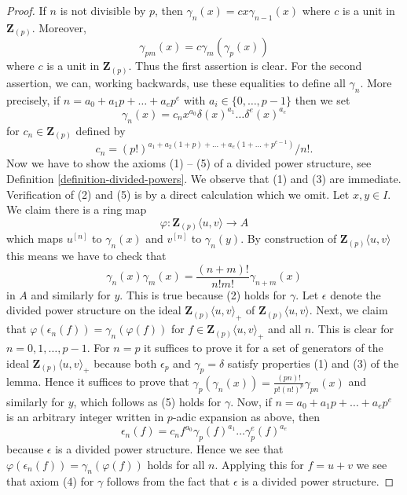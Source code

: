 \begin{proof}
If $n$ is not divisible by $p$, then $\gamma_n(x) = c x \gamma_{n - 1}(x)$
where $c$ is a unit in $\mathbf{Z}_{(p)}$. Moreover,
$$
\gamma_{pm}(x) = c \gamma_m(\gamma_p(x))
$$
where $c$ is a unit in $\mathbf{Z}_{(p)}$. Thus the first assertion is clear.
For the second assertion, we can, working backwards, use these equalities
to define all $\gamma_n$. More precisely, if
$n = a_0 + a_1p + \ldots + a_e p^e$ with $a_i \in \{0, \ldots, p - 1\}$ then
we set
$$
\gamma_n(x) = c_n x^{a_0} \delta(x)^{a_1} \ldots \delta^e(x)^{a_e}
$$
for $c_n \in \mathbf{Z}_{(p)}$ defined by
$$
c_n =
{(p!)^{a_1 + a_2(1 + p) + \ldots + a_e(1 + \ldots + p^{e - 1})}}/{n!}.
$$
Now we have to show the axioms (1) -- (5) of a divided power structure, see
Definition \ref{definition-divided-powers}. We observe that (1) and (3) are
immediate. Verification of (2) and (5) is by a direct calculation which
we omit. Let $x, y \in I$. We claim there is a ring map
$$
\varphi : \mathbf{Z}_{(p)}\langle u, v \rangle \longrightarrow A
$$
which maps $u^{[n]}$ to $\gamma_n(x)$ and $v^{[n]}$ to $\gamma_n(y)$.
By construction of $\mathbf{Z}_{(p)}\langle u, v \rangle$ this means
we have to check that
$$
\gamma_n(x)\gamma_m(x) = \frac{(n + m)!}{n!m!} \gamma_{n + m}(x)
$$
in $A$ and similarly for $y$. This is true because (2) holds for $\gamma$.
Let $\epsilon$ denote the divided power structure on the
ideal $\mathbf{Z}_{(p)}\langle u, v\rangle_{+}$ of
$\mathbf{Z}_{(p)}\langle u, v\rangle$.
Next, we claim that $\varphi(\epsilon_n(f)) = \gamma_n(\varphi(f))$
for $f \in \mathbf{Z}_{(p)}\langle u, v\rangle_{+}$ and all $n$.
This is clear for $n = 0, 1, \ldots, p - 1$. For $n = p$ it suffices
to prove it for a set of generators of the ideal
$\mathbf{Z}_{(p)}\langle u, v\rangle_{+}$ because both $\epsilon_p$
and $\gamma_p = \delta$ satisfy properties (1) and (3) of the lemma.
Hence it suffices to prove that
$\gamma_p(\gamma_n(x)) = \frac{(pn)!}{p!(n!)^p}\gamma_{pn}(x)$ and
similarly for $y$, which follows as (5) holds for $\gamma$.
Now, if $n = a_0 + a_1p + \ldots + a_e p^e$
is an arbitrary integer written in $p$-adic expansion as above, then
$$
\epsilon_n(f) = 
c_n f^{a_0} \gamma_p(f)^{a_1} \ldots \gamma_p^e(f)^{a_e}
$$
because $\epsilon$ is a divided power structure. Hence we see that
$\varphi(\epsilon_n(f)) = \gamma_n(\varphi(f))$ holds for all $n$.
Applying this for $f = u + v$ we see that axiom (4) for $\gamma$
follows from the fact that $\epsilon$ is a divided power structure.
\end{proof}













